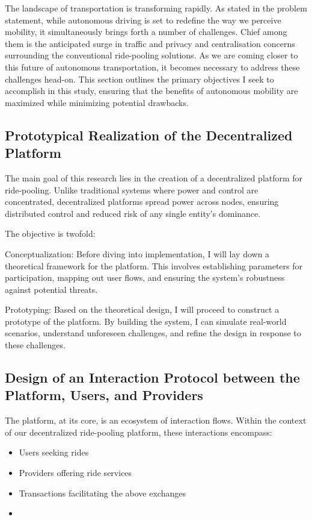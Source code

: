 The landscape of transportation is transforming rapidly. As stated in the problem statement, while autonomous driving is set to redefine the way we perceive mobility, it simultaneously brings forth a number of challenges. Chief among them is the anticipated surge in traffic and privacy and centralisation concerns surrounding the conventional ride-pooling solutions. As we are coming closer to this future of autonomous transportation, it becomes necessary to address these challenges head-on. This section outlines the primary objectives I seek to accomplish in this study, ensuring that the benefits of autonomous mobility are maximized while minimizing potential drawbacks.

\subsection{Prototypical Realization of the Decentralized Platform}

The main goal of this research lies in the creation of a decentralized platform for ride-pooling. Unlike traditional systems where power and control are concentrated, decentralized platforms spread power across nodes, ensuring distributed control and reduced risk of any single entity's dominance.

The objective is twofold:

Conceptualization: Before diving into implementation, I will lay down a theoretical framework for the platform. This involves establishing parameters for participation, mapping out user flows, and ensuring the system's robustness against potential threats.

Prototyping: Based on the theoretical design, I will proceed to construct a prototype of the platform. By building the system, I can simulate real-world scenarios, understand unforeseen challenges, and refine the design in response to these challenges.

\subsection{Design of an Interaction Protocol between the Platform, Users, and Providers}

The platform, at its core, is an ecosystem of interaction flows. Within the context of our decentralized ride-pooling platform, these interactions encompass:

\begin{itemize}
    \item Users seeking rides
    \item Providers offering ride services
    \item Transactions facilitating the above exchanges
    \item <TODO: Complete List>
\end{itemize}

